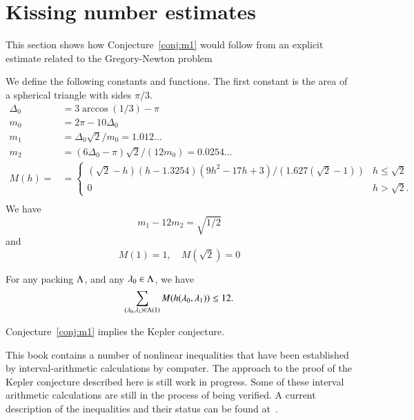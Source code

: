\section{Kissing number estimates}

This section shows how Conjecture~\ref{conj:m1} would follow from an explicit estimate
related to the Gregory-Newton problem


We define the following constants and functions.  The first constant
is the area of a spherical triangle with sides $\pi/3$.
$$
\begin{array}{lll}
\Delta_0 &= 3\arccos(1/3)-\pi\\
m_0 &= 2\pi - 10\Delta_0\\
m_1 &= \Delta_0\sqrt2/m_0 = 1.012\ldots \\ %
m_2  &= (6\Delta_0- \pi)\sqrt2/(12 m_0) = 0.0254\ldots\\ %
M(h) = &=
\begin{cases}
 (\sqrt2-h) (h-1.3254) (9h^2 - 17 h + 3)/(1.627 (\sqrt2-1))& h\le\sqrt2\\
 0 & h >\sqrt2.
\end{cases}
\\
\end{array}
$$
We have 
\begin{equation}\label{eqn:km}m_1 - 12m_2 = \sqrt{1/2}\end{equation}
and
\begin{equation}M(1) = 1,\quad M(\sqrt2) =0\end{equation}


\begin{conjecture}[Marchal]\label{conj:m1} For any packing $\Lambda$, and
any $\lambda_0\in\Lambda$, we have
$$
\sum_{(\lambda_0,\lambda_1)\in\Lambda(1)} M(h(\lambda_0,\lambda_1)) \le 12.
$$
\end{conjecture}

\begin{theorem}\label{theorem:mk1}
Conjecture~\ref{conj:m1} implies the Kepler conjecture.
\end{theorem}

\begin{note}%
This book contains a number of nonlinear inequalities that have been established by interval-arithmetic calculations by computer.  The approach to the proof of the Kepler conjecture described here is still work in progress.  Some of these interval arithmetic calculations are still in the process of being verified.  A current description of the inequalities and their status can be found at~\cite{hales:2009:nonlinear}.
\end{note}

